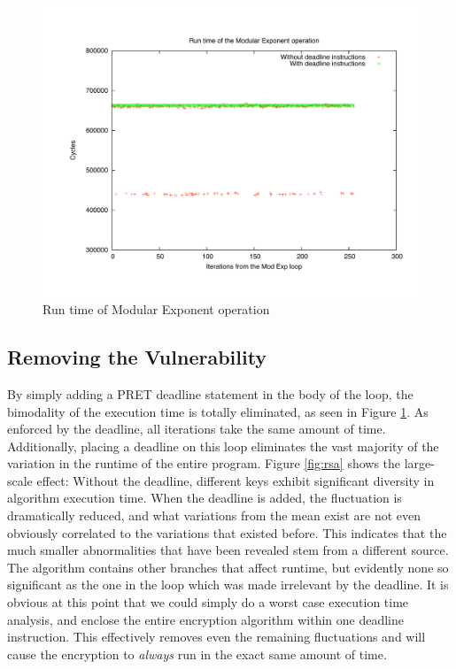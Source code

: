\documentclass[times, 10pt,twocolumn]{article}
\begin{document}
\begin{figure}[ht]
  \centering
  \includegraphics[scale=.3]{./images/ModExp.pdf}
  \caption{Run time of Modular Exponent operation}
  \label{fig:modexp}
\end{figure}

\subsection{Removing the Vulnerability}
By simply adding a PRET deadline statement in the body of the loop, the bimodality of the execution time is totally eliminated, as seen in Figure \ref{fig:modexp}.  As enforced by the deadline, all iterations take the same amount of time.  Additionally, placing a deadline on this loop eliminates the vast majority of the variation in the runtime of the entire program.  Figure \ref{fig:rsa} shows the large-scale effect:  Without the deadline, different keys exhibit significant diversity in algorithm execution time.  When the deadline is added, the fluctuation is dramatically reduced, and what variations from the mean exist are not even obviously correlated to the variations that existed before.  This indicates that the much smaller abnormalities that have been revealed stem from a different source.  The algorithm contains other branches that affect runtime, but evidently none so significant as the one in the loop which was made irrelevant by the deadline. It is obvious at this point that we could simply do a worst case execution time analysis, and enclose the entire encryption algorithm within one deadline instruction. This effectively removes even the remaining fluctuations and will cause the encryption to \emph{always} run in the exact same amount of time.
\end{document}
